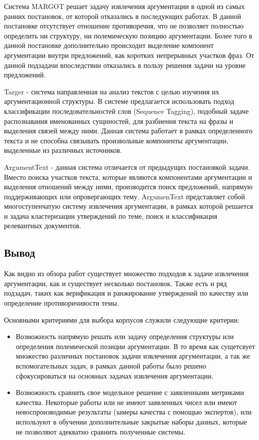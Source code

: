 Система MARGOT решает задачу извлечения аргументации в одной из самых ранних постановок, от которой отказались в последующих работах. В данной постановке отсутствует отношение противоречия, что не позволяет полностью определить ни структуру, ни полемическую позицию аргументации. Более того в данной постановке дополнительно происходит выделение компонент аргументации внутри предложений, как коротких непрерывных участков фраз. От данной подзадачи впоследствии отказались в пользу решения задачи на уровне предложений.

Targer \cite{chernodub2019targer} - система направленная на анализ текстов с целью изучения их аргументационной структуры. В системе предлагается использовать подход классификации последовательностей слов (Sequence Tagging), подобный задаче распознавания именованных сущнностей, для разбиения текста на фразы и выделения связей между ними. Данная система работает в рамках определенного текста и не способна связывать произвольные компоненты аргументации, выделенные из различных источников.


ArgumentText \cite{daxenberger2020argumentext} - данная система отличается от предыдущих постановкой задачи. Вместо поиска участков текста, которые являются компонентами аргументации и выделения отношений между ними, производится поиск предложений, напрямую поддерживающих или опровергающих тему. ArgumenText представляет собой многоступенчатую систему извлечения аргументации, в рамках которой решается и задача кластеризации утверждений по теме, поиск и классификация релевантных документов.


\subsection{Вывод}
Как видно из обзора работ существует множество подходов к задаче извлечения аргументации, как и существует несколько постановок. Также есть и ряд подзадач, таких как верификация и ранжирование утверждений по качеству или определение противоричивости темы.

Основными критериями для выбора корпусов служили следующие критерии:

\begin{itemize}
    \item Возможность напрямую решать или задачу определения структуры или определения полемической позиции аргументации. В то время как сущетсвует множество различных постановок задачи извлечения аргументации, а так же вспомогательных задач, в рамках данной работы было решено сфокусироваться на основных задачах извлечения аргументации.
    \item Возможность сравнить свое модельное решение с заявленными метриками качества. Некоторые работы или не имеют заявленных чисел или имеют невоспроизводимые результаты (замеры качества с помощью экспертов), или используют в обучении дополнительные закрытые наборы данных, которые не позволяют адекватно сравнить полученные системы.
\end{itemize}

